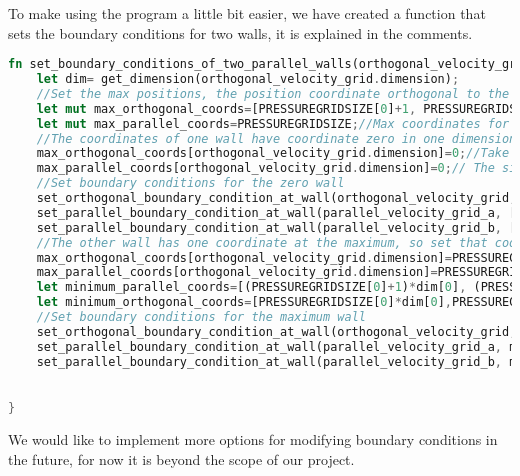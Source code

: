 \documentclass{article}
\begin{document}
To make using the program a little bit easier, we have created a function that sets the boundary conditions for two walls, it is explained in the comments.
\begin{lstlisting}[language=Rust, style=boxed, breaklines=true]
fn set_boundary_conditions_of_two_parallel_walls(orthogonal_velocity_grid: &mut VelocityGrid, parallel_velocity_grid_a: &mut VelocityGrid, parallel_velocity_grid_b: &mut VelocityGrid, orthogonal_velocity_grid_value: f32){
    let dim= get_dimension(orthogonal_velocity_grid.dimension);
    //Set the max positions, the position coordinate orthogonal to the wall will be set to zero later
    let mut max_orthogonal_coords=[PRESSUREGRIDSIZE[0]+1, PRESSUREGRIDSIZE[1]+1, PRESSUREGRIDSIZE[2]+1];//max coordinates for orthogonal velocities  
    let mut max_parallel_coords=PRESSUREGRIDSIZE;//Max coordinates for parallel velocities
    //The coordinates of one wall have coordinate zero in one dimension
    max_orthogonal_coords[orthogonal_velocity_grid.dimension]=0;//Take the wall that has the 0 coordinate in one direction
    max_parallel_coords[orthogonal_velocity_grid.dimension]=0;// The sizes of the parallel grids are the same in the other dimensions, so we will loop through the same values.
    //Set boundary conditions for the zero wall
    set_orthogonal_boundary_condition_at_wall(orthogonal_velocity_grid, [0,0,0], max_orthogonal_coords, orthogonal_velocity_grid_value);
    set_parallel_boundary_condition_at_wall(parallel_velocity_grid_a, [0,0,0], max_parallel_coords, false, orthogonal_velocity_grid.dimension);
    set_parallel_boundary_condition_at_wall(parallel_velocity_grid_b, [0,0,0], max_parallel_coords, false, orthogonal_velocity_grid.dimension);
    //The other wall has one coordinate at the maximum, so set that coordinate to the maximum
    max_orthogonal_coords[orthogonal_velocity_grid.dimension]=PRESSUREGRIDSIZE[orthogonal_velocity_grid.dimension];
    max_parallel_coords[orthogonal_velocity_grid.dimension]=PRESSUREGRIDSIZE[orthogonal_velocity_grid.dimension]+1;
    let minimum_parallel_coords=[(PRESSUREGRIDSIZE[0]+1)*dim[0], (PRESSUREGRIDSIZE[1]+1)*dim[1], (PRESSUREGRIDSIZE[2]+1)*dim[2]];
    let minimum_orthogonal_coords=[PRESSUREGRIDSIZE[0]*dim[0],PRESSUREGRIDSIZE[1]*dim[1], PRESSUREGRIDSIZE[2]*dim[2]];
    //Set boundary conditions for the maximum wall
    set_orthogonal_boundary_condition_at_wall(orthogonal_velocity_grid, minimum_orthogonal_coords, max_orthogonal_coords, orthogonal_velocity_grid_value);
    set_parallel_boundary_condition_at_wall(parallel_velocity_grid_a, minimum_parallel_coords, max_parallel_coords, true, orthogonal_velocity_grid.dimension);
    set_parallel_boundary_condition_at_wall(parallel_velocity_grid_b, minimum_parallel_coords, max_parallel_coords, true, orthogonal_velocity_grid.dimension);
    

}
\end{lstlisting}
We would like to implement more options for modifying boundary conditions in the future, for now it is beyond the scope of our project.
\end{document}
